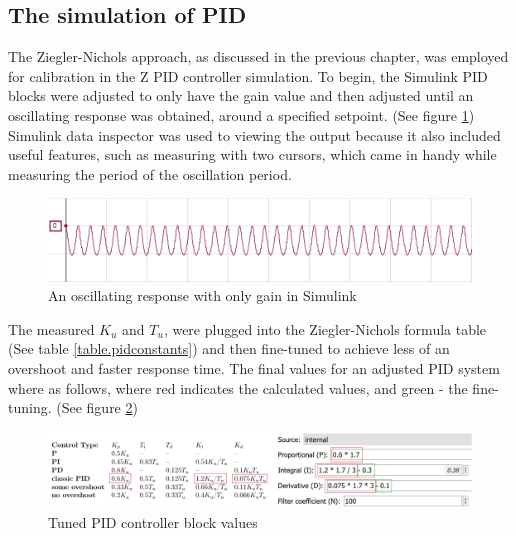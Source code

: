 \subsection{The simulation of PID}

The Ziegler-Nichols approach, as discussed in the previous chapter, was employed for calibration in the Z PID controller simulation. To begin, the Simulink PID blocks were adjusted to only have the gain value and then adjusted until an oscillating response was obtained, around a specified setpoint. (See figure \ref{fig:posc}) Simulink data inspector was used to viewing the output because it also included useful features, such as measuring with two cursors, which came in handy while measuring the period of the oscillation period.

\begin{figure}[H]
    \begin{center}
    \includegraphics[scale=0.75]{pictures/control/posc}
    \end{center}
    \caption{An oscillating response with only gain in Simulink}
    \label{fig:posc}
\end{figure}

The measured $K_u$ and $T_u$, were plugged into the Ziegler-Nichols formula table (See table \ref{table.pidconstants}) and then fine-tuned to achieve less of an overshoot and faster response time.
The final values for an adjusted PID system where as follows, where red indicates the calculated values, and green - the fine-tuning. (See figure \ref{fig:simpidvalues})

\begin{figure}[H]
    \begin{center}
    \includegraphics[scale=0.65]{pictures/control/simpidvalues}
    \end{center}
    \caption{Tuned PID controller block values}
    \label{fig:simpidvalues}
\end{figure}

